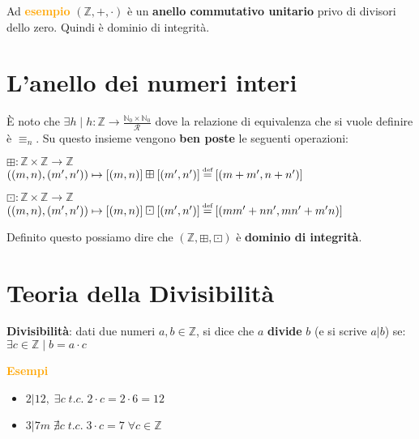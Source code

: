 \begin{boxA}
    Ad \textcolor{orange}{\textbf{esempio}} $(\mathbb{Z}, +, \cdot)$ è un \textbf{anello commutativo unitario} privo di divisori dello zero. Quindi è dominio di integrità.
\end{boxA}

\section{L'anello dei numeri interi}
È noto che $\exists h \; | \; h : \mathbb{Z} \rightarrow \frac{\mathbb{N}_0 \times \mathbb{N}_0}{\mathcal{R}}$ dove la relazione di equivalenza che si vuole definire è $\equiv_n$. Su questo insieme vengono \textbf{ben poste} le seguenti operazioni:
\begin{center}
    $\boxplus : \mathbb{Z} \times \mathbb{Z} \rightarrow \mathbb{Z}$ \\
    $((m, n), (m', n')) \mapsto [(m, n)] \boxplus [(m', n')] \myeq [(m + m', n + n')]$

    $\boxdot : \mathbb{Z} \times \mathbb{Z} \rightarrow \mathbb{Z}$ \\
    $((m, n), (m', n')) \mapsto [(m, n)] \boxdot [(m', n')] \myeq [(mm' + nn', mn' + m'n)]$
\end{center}
Definito questo possiamo dire che $(\mathbb{Z}, \boxplus, \boxdot)$ è \textbf{dominio di integrità}.

\newpage
\section{Teoria della Divisibilità}
\textbf{Divisibilità}: dati due numeri $a,b \in \mathbb{Z}$, si dice che $a$ \textbf{divide} $b$ (e si scrive $a|b$) se: $\exists c \in \mathbb{Z} \; | \; b = a \cdot c$
\begin{boxA}
    \textcolor{orange}{\textbf{Esempi}}
    \begin{itemize}[nosep]
        \item $2|12, \; \exists c \; t.c. \; 2 \cdot c = 2 \cdot 6 = 12$
        \item $3|7m \; \nexists c \; t.c. \; 3 \cdot c = 7 \; \forall c \in \mathbb{Z}$
    \end{itemize}
\end{boxA}


